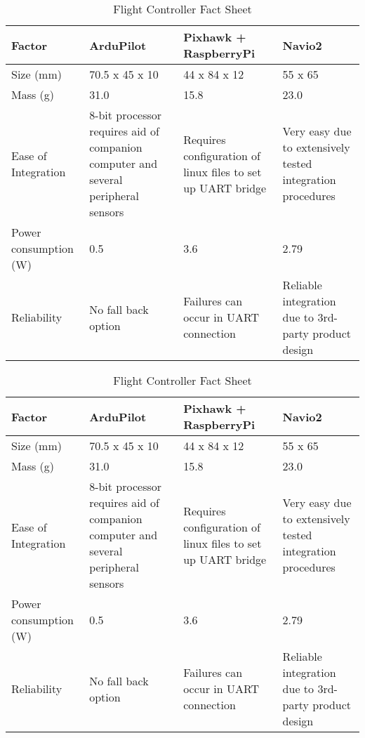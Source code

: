 		\begin{table}[H]
			\centering
			\caption{Flight Controller Fact Sheet}
			\label{tab: flight controller}
			\begin{tabularx}{1\linewidth}{X X X X}
				\toprule
				Factor & ArduPilot & Pixhawk + RaspberryPi & Navio2 \\
			   \midrule
			   	Size (mm) & 70.5 x 45 x 10 & 44 x 84 x 12 & 55 x 65 \\
				Mass (g) & 31.0 & 15.8 & 23.0 \\
				Ease of Integration & 8-bit processor requires aid of companion \mbox{computer} and several peripheral sensors & Requires configuration of linux files to set up UART bridge & Very easy due to extensively tested integration procedures\\
				Power \newline consumption (W) & 0.5 & 3.6 & 2.79 \\
				Reliability & No fall back option & Failures can occur in UART connection & Reliable integration due to 3rd-party product \mbox{design} \\
				\bottomrule
			\end{tabularx}
		\end{table}
 \begin{table}[H]
            \centering
            \caption{Flight Controller Fact Sheet}
            \label{tab: flight controller}
            \begin{tabularx}{1\linewidth}{X X X X}
                \toprule
                Factor & ArduPilot & Pixhawk + RaspberryPi & Navio2 \\
               \midrule
                Size (mm) & 70.5 x 45 x 10 & 44 x 84 x 12 & 55 x 65 \\
                Mass (g) & 31.0 & 15.8 & 23.0 \\
                Ease of Integration & 8-bit processor requires aid of companion \mbox{computer} and several peripheral sensors & Requires configuration of linux files to set up UART bridge & Very easy due to extensively tested integration procedures\\
                Power \newline consumption (W) & 0.5 & 3.6 & 2.79 \\
                Reliability & No fall back option & Failures can occur in UART connection & Reliable integration due to 3rd-party product \mbox{design} \\
                \bottomrule
            \end{tabularx}
        \end{table}
